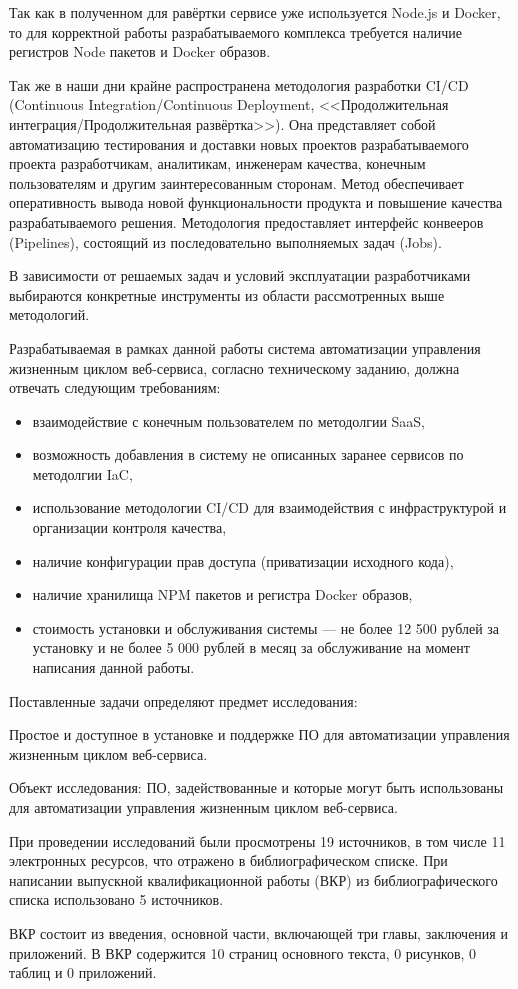Так как в полученном для равёртки сервисе уже используется Node.js и Docker, то для корректной работы разрабатываемого комплекса требуется наличие регистров Node пакетов и Docker образов.

Так же в наши дни крайне распространена методология разработки CI/CD (Continuous Integration/Continuous Deployment, <<Продолжительная интеграция/Продолжительная развёртка>>).
Она представляет собой автоматизацию тестирования и доставки новых проектов разрабатываемого проекта разработчикам, аналитикам, инженерам качества, конечным пользователям и другим заинтересованным сторонам.
Метод обеспечивает оперативность вывода новой функциональности продукта и повышение качества разрабатываемого решения.
Методология предоставляет интерфейс конвееров (Pipelines), состоящий из последовательно выполняемых задач (Jobs).

В зависимости от решаемых задач и условий эксплуатации разработчиками выбираются конкретные инструменты из области рассмотренных выше методологий.

Разрабатываемая в рамках данной работы система автоматизации управления жизненным циклом веб-сервиса,
согласно техническому заданию, должна отвечать следующим требованиям:

\begin{itemize}
    \item взаимодействие с конечным пользователем по методолгии SaaS,
    \item возможность добавления в систему не описанных заранее сервисов по методолгии IaC,
    \item использование методологии CI/CD для взаимодействия с инфраструктурой и организации контроля качества,
    \item наличие конфигурации прав доступа (приватизации исходного кода),
    \item наличие хранилища NPM пакетов и регистра Docker образов,
    \item стоимость установки и обслуживания системы --- не более 12 500 рублей за установку и не более 5 000 рублей в месяц за обслуживание на момент написания данной работы.
\end{itemize}

Поставленные задачи определяют предмет исследования:

Простое и доступное в установке и поддержке ПО для автоматизации управления жизненным циклом веб-сервиса.

Объект исследования: ПО, задействованные и которые могут быть использованы для автоматизации управления жизненным циклом веб-сервиса.

При проведении исследований были просмотрены 19 источников, в том числе 11 электронных ресурсов, что отражено в библиографическом списке.
При написании выпускной квалификационной работы (ВКР) из библиографического списка использовано 5 источников.

ВКР состоит из введения, основной части, включающей три главы, заключения и приложений.
В ВКР содержится 10 страниц основного текста, 0 рисунков, 0 таблиц и 0 приложений.